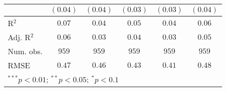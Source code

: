 \begin{table}
\begin{center}
\begin{tabular}{l c c c c c}
              & $(0.04)$     & $(0.04)$     & $(0.03)$     & $(0.03)$      & $(0.04)$      \\
\midrule
R$^2$         & $0.07$       & $0.04$       & $0.05$       & $0.04$        & $0.06$        \\
Adj. R$^2$    & $0.06$       & $0.03$       & $0.04$       & $0.03$        & $0.05$        \\
Num. obs.     & $959$        & $959$        & $959$        & $959$         & $959$         \\
RMSE          & $0.47$       & $0.46$       & $0.43$       & $0.41$        & $0.48$        \\
\bottomrule
\multicolumn{6}{l}{\scriptsize{$^{***}p<0.01$; $^{**}p<0.05$; $^{*}p<0.1$}}
\end{tabular}
\label{tab_emo}
\end{center}
\end{table}
